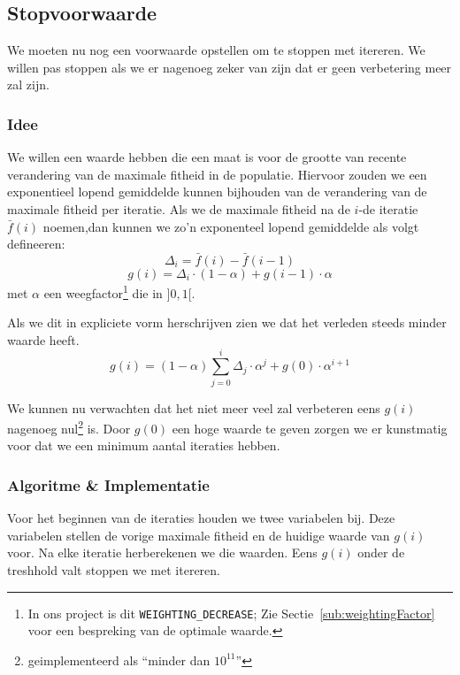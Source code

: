 %
\subsection{Stopvoorwaarde}
\label{ssub:stop_cond}
We moeten nu nog een voorwaarde opstellen om te stoppen met itereren. We willen pas stoppen als we er nagenoeg zeker van zijn dat er geen verbetering meer zal zijn.
\subsubsection{Idee}
We willen een waarde hebben die een maat is voor de grootte van recente verandering van de maximale fitheid in de populatie. Hiervoor zouden we een exponentieel lopend gemiddelde kunnen bijhouden van de verandering van de maximale fitheid per iteratie. Als we de maximale fitheid na de $i$-de iteratie $\bar f(i)$ noemen,dan kunnen we zo'n exponenteel lopend gemiddelde als volgt defineeren:
\[\Delta_i = \bar f(i) - \bar f(i-1)\]
\[g(i) =  \Delta_i \cdot (1-\alpha) + g(i-1)\cdot \alpha\]
met $\alpha$ een weegfactor\footnote{In ons project is dit \texttt{WEIGHTING\_DECREASE}; Zie Sectie~\ref{sub:weightingFactor} voor een bespreking van de optimale waarde.} die in $\rbrack 0,1 \lbrack$.

Als we dit in expliciete vorm herschrijven zien we dat het verleden steeds minder waarde heeft.
\[g(i) = (1-\alpha) \sum^i_{j=0} \Delta_j \cdot \alpha^j + g(0)\cdot \alpha^{i+1}\]

We kunnen nu verwachten dat het niet meer veel zal verbeteren eens $g(i)$ nagenoeg nul\footnote{geimplementeerd als ``minder dan $10^{11}$''} is. Door $g(0)$ een hoge waarde te geven zorgen we er kunstmatig voor dat we een minimum aantal iteraties hebben. 
 
\subsubsection{Algoritme \& Implementatie}
Voor het beginnen van de iteraties houden we twee variabelen bij. Deze variabelen stellen de vorige maximale fitheid en de huidige waarde van $g(i)$ voor. Na elke iteratie herberekenen we die waarden. Eens $g(i)$ onder de treshhold valt stoppen we met itereren. 
 
%